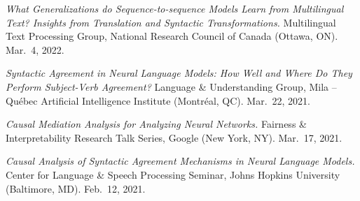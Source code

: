 \documentclass[10pt]{article}
\renewcommand{\section}[1]{\pagebreak[3]%
	\vspace{0.5\baselineskip}%
	\phantomsection\addcontentsline{toc}{section}{#1}%
	\noindent\llap{\bf\scshape\smash{\parbox[t]{\marginparwidth}{\hyphenpenalty=10000\raggedright \textcolor{black}{#1}}}}%
	\vspace{-\baselineskip}\par}
\newcommand{\halfblankline}{\quad\vspace{-0.5\baselineskip}\pagebreak[3]}
\begin{document}
	\halfblankline

	\emph{What Generalizations do Sequence-to-sequence Models Learn from Multilingual Text? Insights from Translation and Syntactic Transformations.} Multilingual Text Processing Group, National Research Council of Canada (Ottawa, ON). Mar.\ 4, 2022.
	
	\halfblankline

	\emph{Syntactic Agreement in Neural Language Models: How Well and Where Do They Perform Subject-Verb Agreement?} Language \& Understanding Group, Mila -- Québec Artificial Intelligence Institute (Montréal, QC). Mar.\ 22, 2021.
	
	\halfblankline

	\emph{Causal Mediation Analysis for Analyzing Neural Networks.} Fairness \& Interpretability Research Talk Series, Google (New York, NY). Mar.\ 17, 2021.
	
	\halfblankline

	\emph{Causal Analysis of Syntactic Agreement Mechanisms in Neural Language Models.} Center for Language \& Speech Processing Seminar, Johns Hopkins University (Baltimore, MD). Feb.\ 12, 2021.
	
	\halfblankline




	
\end{document}
